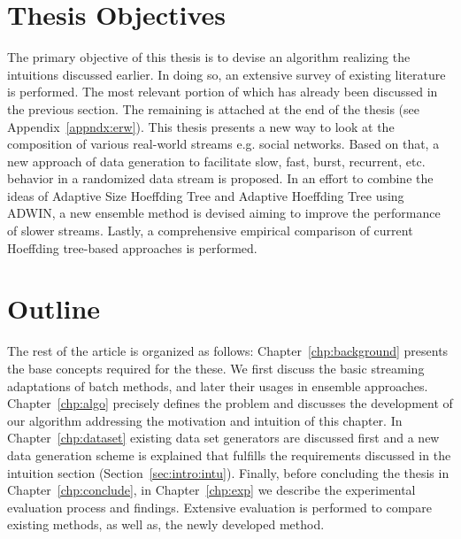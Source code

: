 

\section{Thesis Objectives}
The primary objective of this thesis is to devise an algorithm realizing the intuitions discussed earlier. In doing so, an extensive survey of existing literature is performed. The most relevant portion of which has already been discussed in the previous section. The remaining is attached at the end of the thesis (see Appendix~\ref{appndx:erw}). This thesis presents a new way to look at the composition of various real-world streams e.g. social networks. Based on that, a new approach of data generation to facilitate slow, fast, burst, recurrent, etc. behavior in a randomized data stream is proposed. In an effort to combine the ideas of Adaptive Size Hoeffding Tree and Adaptive Hoeffding Tree using ADWIN, a new ensemble method is devised aiming to improve the performance of slower streams. Lastly, a comprehensive empirical comparison of current Hoeffding tree-based approaches is performed.


\section{Outline}
The rest of the article is organized as follows: Chapter~\ref{chp:background} presents the base concepts required for the these. We first discuss the basic streaming adaptations of batch methods, and later their usages in ensemble approaches. Chapter~\ref{chp:algo} precisely defines the problem and discusses the development of our algorithm addressing the motivation and intuition of this chapter. In Chapter~\ref{chp:dataset} existing data set generators are discussed first and a new data generation scheme is explained that fulfills the requirements discussed in the intuition section (Section~\ref{sec:intro:intu}). Finally, before concluding the thesis in Chapter~\ref{chp:conclude}, in Chapter~\ref{chp:exp} we describe the experimental evaluation process and findings. Extensive evaluation is performed to compare existing methods, as well as, the newly developed method. 
